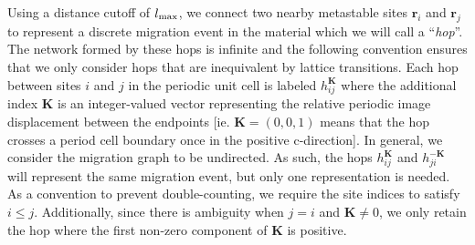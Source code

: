 \documentclass[reprint,preprintnumbers,amsmath,amssymb,aps,prl]{revtex4-1}
\newcommand{\GM}[1]{$\mathcal{G}$({#1})}
\begin{document}
Using a distance cutoff of $l_{\rm max}$, we connect two nearby metastable sites $\mathbf{r}_i$ and $\mathbf{r}_j$ to represent a discrete migration event in the material which we will call a ``{\it hop}''.
The network formed by these hops is infinite and the following convention ensures that we only consider hops that are inequivalent by lattice transitions.
Each hop between sites $i$ and $j$ in the periodic unit cell is labeled $h_{ij}^{\mathbf{K}}$ where the additional index $\mathbf{K}$ is an integer-valued vector representing the relative periodic image displacement between the endpoints [ie. $\mathbf{K} = (0,0,1)$ means that the hop crosses a period cell boundary once in the positive c-direction].
In general, we consider the migration graph to be undirected. 
As such, the hops $h_{ij}^{\mathbf{K}}$ and $h_{ji}^{-\mathbf{K}}$ will represent the same migration event, but only one representation is needed.
As a convention to prevent double-counting, we require the site indices to satisfy $i \leq j$.
Additionally, since there is ambiguity when $j = i$ and $\bm{K}\neq 0$, we only retain the hop where the first non-zero component of $\mathbf{K}$ is positive.
\end{document}
